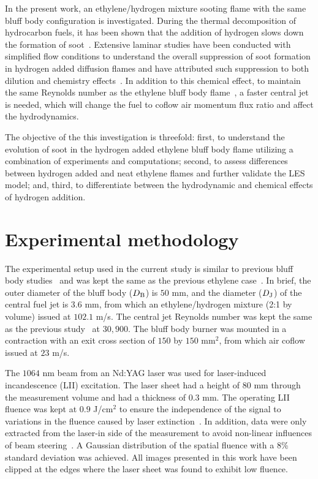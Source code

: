 \documentclass[review,3p,times]{elsarticle}
\begin{document}
In the present work, an ethylene/hydrogen mixture sooting flame with the same bluff body configuration is investigated.  During the thermal decomposition of hydrocarbon fuels, it has been shown that the addition of hydrogen slows down the formation of soot~\cite{tesner58}.  Extensive laminar studies have been conducted with simplified flow conditions to understand the overall suppression of soot formation in hydrogen added diffusion flames and have attributed such suppression to both dilution and chemistry effects~\cite{dearden68,du95,gulder96,guo06,zhao14}.  In addition to this chemical effect, to maintain the same Reynolds number as the ethylene bluff body flame~\cite{mueller13}, a faster central jet is needed, which will change the fuel to coflow air momentum flux ratio and affect the hydrodynamics.

The objective of the this investigation is threefold: first, to understand the evolution of soot in the hydrogen added ethylene bluff body flame utilizing a combination of experiments and computations; second, to assess differences between hydrogen added and neat ethylene flames and further validate the LES model; and, third, to differentiate between the hydrodynamic and chemical effects of hydrogen addition.



\section{Experimental methodology}

The experimental setup used in the current study is similar to previous bluff body studies~\cite{dally96,dally98a} and was kept the same as the previous ethylene case~\cite{mueller13}.  In brief, the outer diameter of the bluff body ($D_{\rm B}$) is $50$ mm, and the diameter ($D_{\rm J}$) of the central fuel jet is $3.6$ mm, from which an ethylene/hydrogen mixture (2:1 by volume) issued at $102.1$ m/s.  The central jet Reynolds number was kept the same as the previous study~\cite{mueller13} at $30,900$.  The bluff body burner was mounted in a contraction with an exit cross section of $150$ by $150$ mm$^2$, from which air coflow issued at $23$ m/s.  

The $1064$ nm beam from an Nd:YAG laser was used for laser-induced incandescence (LII) excitation.  The laser sheet had a height of $80$ mm through the measurement volume and had a thickness of $0.3$ mm.  The operating LII fluence was kept at $0.9$ J/cm$^2$ to ensure the independence of the signal to variations in the fluence caused by laser extinction~\cite{qamar09,schulz06}.  In addition, data were only extracted from the laser-in side of the measurement to avoid non-linear influences of beam steering~\cite{sun15}.  A Gaussian distribution of the spatial fluence with a $8$\% standard deviation was achieved.  All images presented in this work have been clipped at the edges where the laser sheet was found to exhibit low fluence.   
\end{document}

